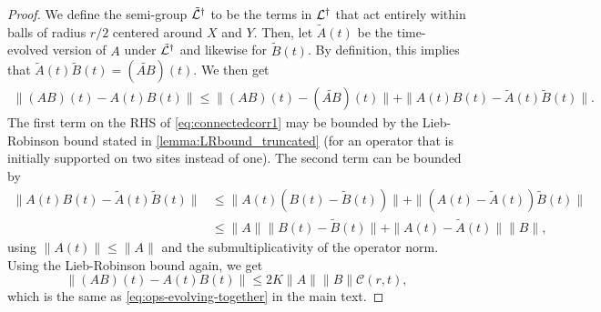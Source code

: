 \begin{proof}
We define the semi-group $\tilde {\mathcal{L}}^\dag$ to be the terms in $\mathcal{L}^\dag$ that act entirely within balls of radius $r/2$ centered around $X$ and $Y$.
Then, let $\tilde A(t)$ be the time-evolved version of $A$ under $\tilde {\mathcal{L}}^\dag$ and likewise for $\tilde B(t)$.
By definition, this implies that $\tilde A(t)\tilde B(t) = (\widetilde{AB})(t)$.
We then get
\begin{align}
\label{eq:connectedcorr1}
  \|(AB)(t)-A(t)B(t)\| \le \| (AB)(t) - (\widetilde{AB})(t) \| + \|A(t)B(t)-\tilde A(t) \tilde B(t) \|.
\end{align}
The first term on the RHS of \cref{eq:connectedcorr1} may be bounded by the Lieb-Robinson bound stated in \cref{lemma:LRbound_truncated} (for an operator that is initially supported on two sites instead of one). The second term can be bounded by
\begin{align}
  \|A(t)B(t)-\tilde A(t) \tilde B(t) \| &\le \|A(t)(B(t)-\tilde B(t))\|+\|(A(t)-\tilde A(t))\tilde B(t)\|\\
  &\le \|A\|\|B(t)-\tilde B(t)\|+\|A(t)-\tilde A(t)\|\|B\|,
\end{align}
using $\|A(t)\|\le \|A\|$ and the submultiplicativity of the operator norm.
Using the Lieb-Robinson bound again, we get
\begin{equation}
    \|(AB)(t) - A(t)B(t)\| \le 2K\|A\|\|B\|\mathcal C(r,t),
\end{equation}
which is the same as \cref{eq:ops-evolving-together} in the main text.
\end{proof}

